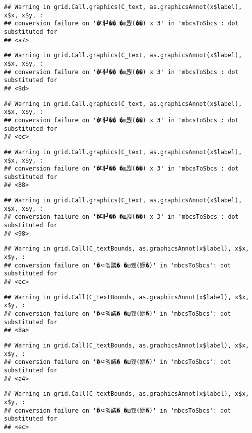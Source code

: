 \documentclass[
]{article}
\begin{document}
\begin{verbatim}
## Warning in grid.Call.graphics(C_text, as.graphicsAnnot(x$label), x$x, x$y, :
## conversion failure on '�대┛�� �щ쭩(��) x 3' in 'mbcsToSbcs': dot substituted for
## <a7>
\end{verbatim}

\begin{verbatim}
## Warning in grid.Call.graphics(C_text, as.graphicsAnnot(x$label), x$x, x$y, :
## conversion failure on '�대┛�� �щ쭩(��) x 3' in 'mbcsToSbcs': dot substituted for
## <9d>
\end{verbatim}

\begin{verbatim}
## Warning in grid.Call.graphics(C_text, as.graphicsAnnot(x$label), x$x, x$y, :
## conversion failure on '�대┛�� �щ쭩(��) x 3' in 'mbcsToSbcs': dot substituted for
## <ec>
\end{verbatim}

\begin{verbatim}
## Warning in grid.Call.graphics(C_text, as.graphicsAnnot(x$label), x$x, x$y, :
## conversion failure on '�대┛�� �щ쭩(��) x 3' in 'mbcsToSbcs': dot substituted for
## <88>
\end{verbatim}

\begin{verbatim}
## Warning in grid.Call.graphics(C_text, as.graphicsAnnot(x$label), x$x, x$y, :
## conversion failure on '�대┛�� �щ쭩(��) x 3' in 'mbcsToSbcs': dot substituted for
## <98>
\end{verbatim}

\begin{verbatim}
## Warning in grid.Call(C_textBounds, as.graphicsAnnot(x$label), x$x, x$y, :
## conversion failure on '�ㅼ엥議� �ш퀬(嫄�)' in 'mbcsToSbcs': dot substituted for
## <ec>
\end{verbatim}

\begin{verbatim}
## Warning in grid.Call(C_textBounds, as.graphicsAnnot(x$label), x$x, x$y, :
## conversion failure on '�ㅼ엥議� �ш퀬(嫄�)' in 'mbcsToSbcs': dot substituted for
## <8a>
\end{verbatim}

\begin{verbatim}
## Warning in grid.Call(C_textBounds, as.graphicsAnnot(x$label), x$x, x$y, :
## conversion failure on '�ㅼ엥議� �ш퀬(嫄�)' in 'mbcsToSbcs': dot substituted for
## <a4>
\end{verbatim}

\begin{verbatim}
## Warning in grid.Call(C_textBounds, as.graphicsAnnot(x$label), x$x, x$y, :
## conversion failure on '�ㅼ엥議� �ш퀬(嫄�)' in 'mbcsToSbcs': dot substituted for
## <ec>
\end{verbatim}
\end{document}
